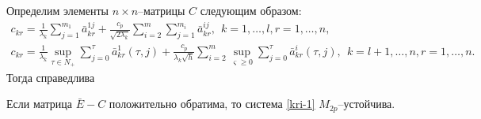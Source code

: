 Определим  элементы $n\times n$--матрицы $C$ следующим образом:
$$
\begin{array}{crl}
c_{kr} = \frac{1}{\lambda _k}\sum \limits_{j=1}^{m_1} \bar
a^{1j}_{kr} + \frac{c_p}{\sqrt{2\lambda _k}} \sum \limits_{i=2}^m
\sum \limits_{j=1}^{m_i} \bar a^{ij}_{kr}, \ \  k
= 1, \dots ,l, r = 1, \dots, n,\\
c_{kr} = \frac{1}{\lambda _k}\mathrel {\mathop {\sup}  \limits
_{\tau \in N_+ }} \sum \limits _{j=0 }^{\tau}\bar a^{1}_{kr}(\tau,j)
+ \frac{c_p}{\lambda _k\sqrt{h}} \sum \limits _{i=2}^{m}\mathrel
{\mathop {\sup}  \limits _{\varsigma \geq 0 }} \sum \limits _{j=0
}^{\tau} \bar a^{i}_{kr}(\tau,j), \ \ k = l+1, \dots,n, r = 1, \dots, n.
\end{array}
$$
Тогда справедлива

\begin{theorem}\label{kri-th4} Если матрица $\bar E - C$ положительно
обратима, то система \eqref{kri-1} $M_{2p}$--устой\-чи\-ва.
\end{theorem}

